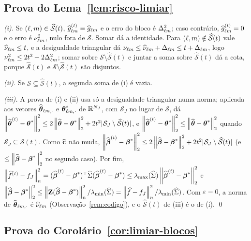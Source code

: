 \documentclass[11pt,a4paper]{article}
\newcommand{\lmin}{\lambda_{\min}}
\newcommand{\bbeta}{\boldsymbol{\beta}}
\newcommand{\betahat}{\widehat{\bbeta}}
\newcommand{\eps}{\varepsilon}
\newcommand{\ghat}[2]{\widehat{g}_{#1#2}}
\newcommand{\Nhat}[2]{\widehat{\nu}_{#1#2}}
\newcommand{\Ntrue}[2]{\nu_{#1#2}}
\newcommand{\Shat}{\widehat{\mathcal{S}}}
\newcommand{\lmaxx}{\lambda_{\max}}
\newcommand{\Dbl}{\Delta_{\cv\md}}
\newcommand{\betastar}{\bbeta^{*}}
\begin{document}
\subsection*{Prova do Lema~\ref{lem:risco-limiar}}

\emph{(i).} Se $(\cv,\md) \in \Shat(t)$, $\ghat{\cv}{\md}^{(t)} =
\ghat{\cv}{\md}$ e o erro do bloco é $\Dbl^{2}$; caso contrário,
$\ghat{\cv}{\md}^{(t)} = 0$ e o erro é $\Ntrue{\cv}{\md}^{2}$, nulo fora de
$\mathcal{S}$. Somar dá a identidade. Para $(\cv,\md) \notin \Shat(t)$ vale
$\Nhat{\cv}{\md} \le t$, e a desigualdade triangular dá $\Ntrue{\cv}{\md} \le
\Nhat{\cv}{\md} + \Dbl \le t + \Dbl$, logo $\Ntrue{\cv}{\md}^{2} \le 2t^{2} +
2\Dbl^{2}$; somar sobre $\mathcal{S}\setminus\Shat(t)$ e juntar a soma sobre
$\Shat(t)$ dá a cota, porque $\Shat(t)$ e $\mathcal{S}\setminus\Shat(t)$ são
disjuntos.

\emph{(ii).} Se $\mathcal{S} \subseteq \Shat(t)$, a segunda soma de (i) é
vazia.

\emph{(iii).} A prova de (i) e (ii) usa só a desigualdade triangular numa
norma; aplicada aos vetores $\widehat{\boldsymbol{\theta}}_{\ell m,\cdot}$ e
$\boldsymbol{\theta}^{*}_{\ell m,\cdot}$ de $\mathbb{R}^{N_{J}}$, com $\mathcal{S}_{J}$ no lugar de
$\mathcal{S}$, dá $\norm{\thetahat^{(t)} - \thetastar}_{2}^{2} \le
2\norm{\thetahat - \thetastar}_{2}^{2} + 2t^{2}|\mathcal{S}_{J}\setminus\Shat(t)|$,
e $\left\lVert \widehat{\boldsymbol{\theta}}^{(t)} - \boldsymbol{\theta}^{*} \right\rVert_{2}^{2} \le \left\lVert \widehat{\boldsymbol{\theta}} -
\boldsymbol{\theta}^{*} \right\rVert_{2}^{2}$ quando $\mathcal{S}_{J} \subseteq \Shat(t)$. Como
$\widehat{\mathbf{c}}$ não muda, $\norm{\betahat^{(t)} - \betastar}_{2}^{2} \le
2\norm{\betahat - \betastar}_{2}^{2} + 2t^{2}|\mathcal{S}_{J}\setminus\Shat(t)|$
(e $\le \norm{\betahat - \betastar}_{2}^{2}$ no segundo caso). Por fim,
$\normn{\widehat f^{(t)} - f_{J}}^{2} = (\betahat^{(t)} - \betastar)\T\Gramhat
(\betahat^{(t)} - \betastar) \le \lmaxx(\Gramhat)\norm{\betahat^{(t)} -
\betastar}_{2}^{2}$ e $\norm{\betahat - \betastar}_{2}^{2} \le
\normn{\bZ(\betahat - \betastar)}^{2}/\lmin(\Gramhat) =
\normn{\widehat f - f_{J}}^{2}/\lmin(\Gramhat)$. Com $\eps = 0$, a norma de
$\widehat{\boldsymbol{\theta}}_{\ell m,\cdot}$ é $\Nhat{\cv}{\md}$
(Observação~\ref{rem:codigo}), e o $\Shat(t)$ de (iii) é o de (i). \qed

\subsection*{Prova do Corolário~\ref{cor:limiar-blocos}}
\end{document}
